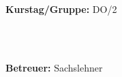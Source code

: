 \documentclass[12pt,a4paper]{article}
\begin{document}
\begin{verbatim}


\end{verbatim}
			\begin{flushleft}
			\textbf{\Large{Kurstag/Gruppe:}} \Large{DO/2}
			\end{flushleft}

\begin{verbatim}



\end{verbatim}
			\begin{flushleft}
			\LARGE{\textbf{Betreuer:}}	\Large{Sachslehner}	
			\end{flushleft}
\end{document}
